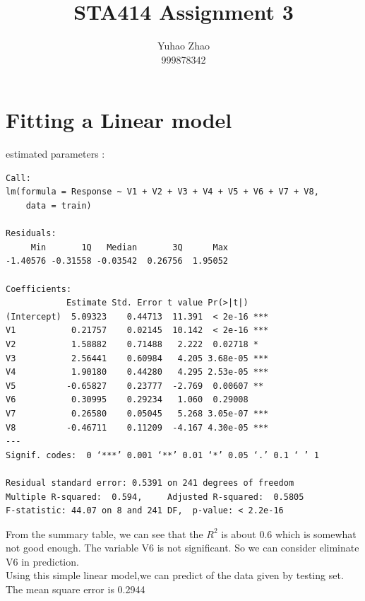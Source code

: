\documentclass[12pt]{article}
\begin{document}
 
 
\title{STA414 Assignment 3  }%
\author{Yuhao Zhao\\ %
999878342} %
 
\maketitle
 
\section{Fitting a Linear model}
estimated parameters :
\begin{verbatim}
Call:
lm(formula = Response ~ V1 + V2 + V3 + V4 + V5 + V6 + V7 + V8, 
    data = train)

Residuals:
     Min       1Q   Median       3Q      Max 
-1.40576 -0.31558 -0.03542  0.26756  1.95052 

Coefficients:
            Estimate Std. Error t value Pr(>|t|)    
(Intercept)  5.09323    0.44713  11.391  < 2e-16 ***
V1           0.21757    0.02145  10.142  < 2e-16 ***
V2           1.58882    0.71488   2.222  0.02718 *  
V3           2.56441    0.60984   4.205 3.68e-05 ***
V4           1.90180    0.44280   4.295 2.53e-05 ***
V5          -0.65827    0.23777  -2.769  0.00607 ** 
V6           0.30995    0.29234   1.060  0.29008    
V7           0.26580    0.05045   5.268 3.05e-07 ***
V8          -0.46711    0.11209  -4.167 4.30e-05 ***
---
Signif. codes:  0 ‘***’ 0.001 ‘**’ 0.01 ‘*’ 0.05 ‘.’ 0.1 ‘ ’ 1

Residual standard error: 0.5391 on 241 degrees of freedom
Multiple R-squared:  0.594,     Adjusted R-squared:  0.5805 
F-statistic: 44.07 on 8 and 241 DF,  p-value: < 2.2e-16

\end{verbatim}

From the summary table, we can see that the $R^2$ is about 0.6 which is somewhat not good enough. The variable V6 is not significant. So we can consider eliminate V6 in prediction.  \\

Using this simple linear model,we can predict of the data given by testing set. The mean square error is 0.2944
\end{document}

